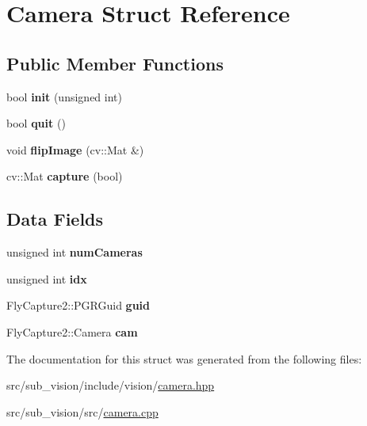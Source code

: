 \hypertarget{structCamera}{}\section{Camera Struct Reference}
\label{structCamera}
\subsection*{Public Member Functions}
\begin{DoxyCompactItemize}
\item 
\mbox{\label{structCamera_abe534466020a7f205f3601df56910355}} 
bool {\bfseries init} (unsigned int)
\item 
\mbox{\label{structCamera_a47b5a859eccd3f9116d6d8711827d97e}} 
bool {\bfseries quit} ()
\item 
\mbox{\label{structCamera_ad1b94205b75a72be4a1404ac89cd7cb7}} 
void {\bfseries flip\+Image} (cv\+::\+Mat \&)
\item 
\mbox{\label{structCamera_a04ffef4242a8badeddda350c23b8a779}} 
cv\+::\+Mat {\bfseries capture} (bool)
\end{DoxyCompactItemize}
\subsection*{Data Fields}
\begin{DoxyCompactItemize}
\item 
\mbox{\label{structCamera_ad3577398f7e9c4befb37c4b1305af9c7}} 
unsigned int {\bfseries num\+Cameras}
\item 
\mbox{\label{structCamera_afa1f437801fc81e7d8b8b6e5d9f91014}} 
unsigned int {\bfseries idx}
\item 
\mbox{\label{structCamera_a64d917f0e75d549935405cc46e4acc87}} 
Fly\+Capture2\+::\+P\+G\+R\+Guid {\bfseries guid}
\item 
\mbox{\label{structCamera_ad69ad787259432ab8cbff8d04c96511a}} 
Fly\+Capture2\+::\+Camera {\bfseries cam}
\end{DoxyCompactItemize}


The documentation for this struct was generated from the following files\+:\begin{DoxyCompactItemize}
\item 
src/sub\+\_\+vision/include/vision/\hyperlink{camera_8hpp}{camera.\+hpp}\item 
src/sub\+\_\+vision/src/\hyperlink{camera_8cpp}{camera.\+cpp}\end{DoxyCompactItemize}
